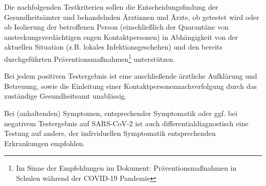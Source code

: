 \documentclass{article}
\begin{document}
Die nachfolgenden Testkriterien sollen die Entscheidungsfindung der Gesundheitsämter und behandelnden Ärztinnen und Ärzte, ob getestet wird oder ob Isolierung der betroffenen Person (einschließlich der Quarantäne von ansteckungsverdächtigen engen Kontaktpersonen) in Abhängigkeit von der aktuellen Situation (z.B. lokales Infektionsgeschehen) und den bereits durchgeführten Präventionsmaßnahmen\footnote{Im Sinne der Empfehlungen im Dokument: Präventionsmaßnahmen in Schulen während der COVID-19 Pandemie} unterstützen. 


Bei jedem positiven Testergebnis ist eine anschließende ärztliche Aufklärung und Betreuung, sowie die Einleitung einer Kontaktpersonennachverfolgung durch das zuständige Gesundheitsamt unablässig. 


Bei (anhaltenden) Symptomen, entsprechender Symptomatik oder ggf. bei negativem Testergebnis auf SARS-CoV-2 ist auch differentialdiagnostisch eine Testung auf andere, der individuellen Symptomatik entsprechenden Erkrankungen empfohlen.
\end{document}
